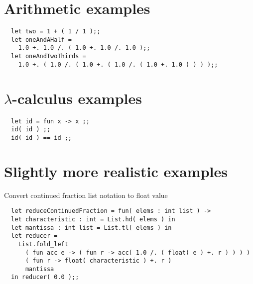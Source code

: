 \documentclass{article}
\begin{document}

\section{Arithmetic examples}
\lstset{language=[Objective]Caml}\begin{lstlisting}
  let two = 1 + ( 1 / 1 );;
  let oneAndAHalf =
    1.0 +. 1.0 /. ( 1.0 +. 1.0 /. 1.0 );;
  let oneAndTwoThirds =
    1.0 +. ( 1.0 /. ( 1.0 +. ( 1.0 /. ( 1.0 +. 1.0 ) ) ) );;
\end{lstlisting}

\section{$\lambda$-calculus examples}
\lstset{language=[Objective]Caml}\begin{lstlisting}
  let id = fun x -> x ;;
  id( id ) ;;
  id( id ) == id ;;
\end{lstlisting}

\section{Slightly more realistic examples}
Convert continued fraction list notation to float value

\lstset{language=[Objective]Caml}\begin{lstlisting}
  let reduceContinuedFraction = fun( elems : int list ) ->
  let characteristic : int = List.hd( elems ) in
  let mantissa : int list = List.tl( elems ) in
  let reducer =
    List.fold_left
      ( fun acc e -> ( fun r -> acc( 1.0 /. ( float( e ) +. r ) ) ) )
      ( fun r -> float( characteristic ) +. r )
      mantissa
  in reducer( 0.0 );;
\end{lstlisting}

\break
\end{document}
